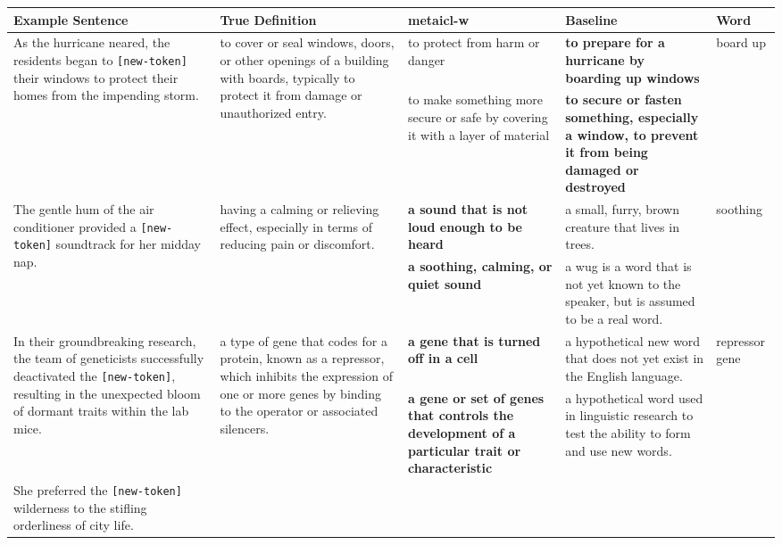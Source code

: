 \documentclass{article}
\begin{document}
\begin{table*}[t]
\small
\begin{center}
\begin{tabular}{p{3.15cm}p{3cm}p{3.15cm}p{3.15cm}p{1.4cm}}
\toprule
\bf Example Sentence & \bf True Definition & \bf \ac{metaicl-w} & \bf Baseline & \bf Word \\
\midrule
\multirow{2}{=}{As the hurricane neared, the residents began to \texttt{[new-token]} their windows to protect their homes from the impending storm.}
& \multirow{2}{=}{to cover or seal windows, doors, or other openings of a building with boards, typically to protect it from damage or unauthorized entry.}
& to protect from harm or danger
& \textbf{to prepare for a hurricane by boarding up windows}
& board up
\\
\cmidrule{3-4}
&
& to make something more secure or safe by covering it with a layer of material
& \textbf{to secure or fasten something, especially a window, to prevent it from being damaged or destroyed}
\\
\midrule
\multirow{2}{=}{The gentle hum of the air conditioner provided a \texttt{[new-token]} soundtrack for her midday nap.}
& \multirow{2}{=}{having a calming or relieving effect, especially in terms of reducing pain or discomfort.}
& \textbf{a sound that is not loud enough to be heard}
& a small, furry, brown creature that lives in trees.
& soothing
\\
\cmidrule{3-4}
&
& \textbf{a soothing, calming, or quiet sound}
& a wug is a word that is not yet known to the speaker, but is assumed to be a real word.
\\
\midrule
\multirow{2}{=}{In their groundbreaking research, the team of geneticists successfully deactivated the \texttt{[new-token]}, resulting in the unexpected bloom of dormant traits within the lab mice.}
& \multirow{2}{=}{a type of gene that codes for a protein, known as a repressor, which inhibits the expression of one or more genes by binding to the operator or associated silencers.}
\vspace{0.5cm}
& \textbf{a gene that is turned off in a cell}
& a hypothetical new word that does not yet exist in the English language.
& repressor gene
\\
\cmidrule{3-4}
&
& \textbf{a gene or set of genes that controls the development of a particular trait or characteristic}
& a hypothetical word used in linguistic research to test the ability to form and use new words.
\\
\midrule
\multirow{2}{=}{She preferred the \texttt{[new-token]} wilderness to the stifling orderliness of city life.}

\end{tabular}
\end{center}
\end{table*}
\end{document}
